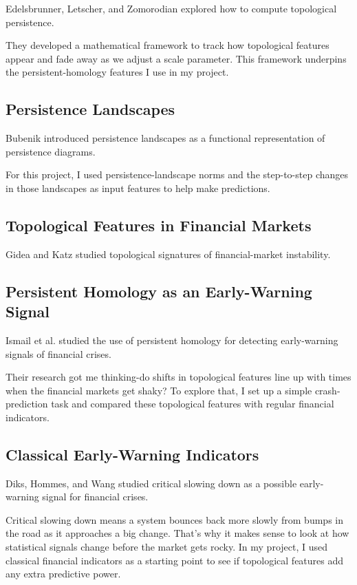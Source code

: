 \documentclass[oneside,english,11pt]{article}
\begin{document}
Edelsbrunner, Letscher, and Zomorodian \citep{edelsbrunner2002} explored how to compute topological persistence.

They developed a mathematical framework to track how topological features appear and fade away as we adjust a scale parameter. This framework underpins the persistent-homology features I use in my project.


\subsection{Persistence Landscapes}

Bubenik \citep{bubenik2015} introduced persistence landscapes as a functional representation of persistence diagrams.

For this project, I used persistence-landscape norms and the step-to-step changes in those landscapes as input features to help make predictions.


\subsection{Topological Features in Financial Markets}

Gidea and Katz \citep{gidea2018} studied topological signatures of financial-market instability.


\subsection{Persistent Homology as an Early-Warning Signal}

Ismail et al. \citep{ismail2022} studied the use of persistent homology for detecting early-warning signals of financial crises.

Their research got me thinking-do shifts in topological features line up with times when the financial markets get shaky?
To explore that, I set up a simple crash-prediction task and compared these topological features with regular financial indicators.


\subsection{Classical Early-Warning Indicators}

Diks, Hommes, and Wang \citep{diks2019} studied critical slowing down as a possible early-warning signal for financial crises.

Critical slowing down means a system bounces back more slowly from bumps in the road as it approaches a big change.
That’s why it makes sense to look at how statistical signals change before the market gets rocky.
In my project, I used classical financial indicators as a starting point to see if topological features add any extra predictive power.
\end{document}
